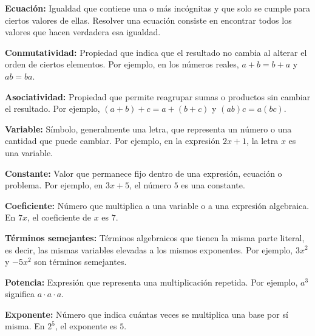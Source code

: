 \documentclass[12pt,final]{report}
\theoremstyle{plain}
\theoremstyle{definition}
\begin{document}
\vspace{0.5em}

\textbf{Ecuación:} Igualdad que contiene una o más incógnitas y que solo se cumple para ciertos valores de ellas. Resolver una ecuación consiste en encontrar todos los valores que hacen verdadera esa igualdad.

\vspace{0.5em}

\textbf{Conmutatividad:} Propiedad que indica que el resultado no cambia al alterar el orden de ciertos elementos. Por ejemplo, en los números reales, $a+b=b+a$ y $ab=ba$.

\vspace{0.5em}

\textbf{Asociatividad:} Propiedad que permite reagrupar sumas o productos sin cambiar el resultado. Por ejemplo, $(a+b)+c = a+(b+c)$ y $(ab)c = a(bc)$.
\vspace{0.5em}

\textbf{Variable:} Símbolo, generalmente una letra, que representa un número o una cantidad que puede cambiar. Por ejemplo, en la expresión $2x+1$, la letra $x$ es una variable.

\vspace{0.5em}

\textbf{Constante:} Valor que permanece fijo dentro de una expresión, ecuación o problema. Por ejemplo, en $3x+5$, el número $5$ es una constante.

\vspace{0.5em}

\textbf{Coeficiente:} Número que multiplica a una variable o a una expresión algebraica. En $7x$, el coeficiente de $x$ es $7$.

\vspace{0.5em}

\textbf{Términos semejantes:} Términos algebraicos que tienen la misma parte literal, es decir, las mismas variables elevadas a los mismos exponentes. Por ejemplo, $3x^2$ y $-5x^2$ son términos semejantes.

\vspace{0.5em}

\textbf{Potencia:} Expresión que representa una multiplicación repetida. Por ejemplo, $a^3$ significa $a \cdot a \cdot a$.

\vspace{0.5em}

\textbf{Exponente:} Número que indica cuántas veces se multiplica una base por sí misma. En $2^5$, el exponente es $5$.
\end{document}
